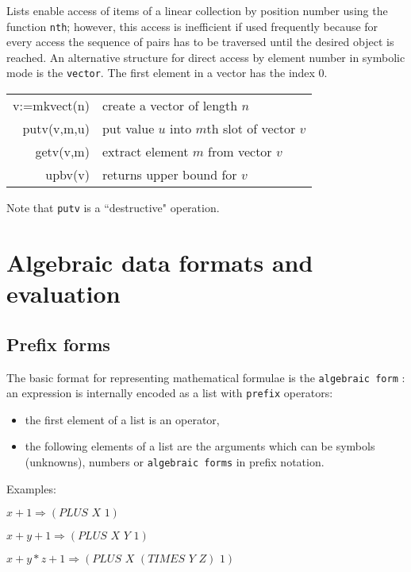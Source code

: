 Lists enable access of items of a linear collection by
position number using the function {\tt nth}; however, this
access is inefficient if used frequently because for
every access the sequence of pairs has to be traversed
until the desired object is reached. An alternative
structure for direct access by element number in 
symbolic mode is the {\tt vector}. The first element
in a vector has the index $0$. 
\begin{center}
\begin{tabular}{|r|l|} \hline
 v:=mkvect(n) & create a vector of length $n$ \\
 putv(v,m,u)  & put value $u$ into $m$th slot of vector $v$\\ 
 getv(v,m)    & extract element $m$ from vector $v$ \\
 upbv(v)      & returns upper bound for $v$ \\
\hline
\end{tabular}
\end{center}
Note that {\tt putv} is a ``destructive" operation.
\section{Algebraic data formats and evaluation}

\subsection{Prefix forms}

The basic format for representing mathematical
formulae is the {\tt algebraic form} : an
expression is internally encoded as a list
with {\tt prefix} operators: 
\begin{itemize}
\item the first element of a list is an operator,
\item the following elements of a list are the arguments
  which can be symbols (unknowns), numbers or 
  {\tt algebraic forms} in prefix notation.
\end{itemize}

Examples:

$x+1 \Rightarrow (PLUS\,\, X\,\, 1)$

$x+y+1 \Rightarrow (PLUS\,\, X\,\, Y\,\, 1)$

$x+ y*z + 1 \Rightarrow (PLUS\,\, X\,\, (TIMES\,\, Y\,\, Z)\,\, 1)$


